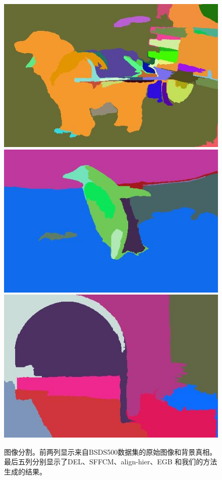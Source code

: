 \begin{figure}[h]
{\begin{minipage}[b]{0.13\linewidth}
\includegraphics[width=1\linewidth]{figures/img/ours_seg/ours_247012.jpg}
\includegraphics[width=1\linewidth]{figures/img/ours_seg/ours_106005.jpg}
\includegraphics[width=1\linewidth]{figures/img/ours_seg/ours_5096.jpg}
\end{minipage}}
\hspace{-2.2mm}
\caption{图像分割。前两列显示来自BSDS500数据集的原始图像和背景真相。最后五列分别显示了DEL、SFFCM、align-hier、EGB 和我们的方法生成的结果。}
\label{Fig.4}
\end{figure}

